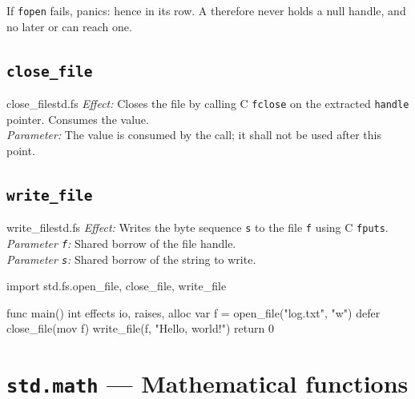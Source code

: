 \begin{note}
  If \texttt{fopen} fails,  panics: hence  in its row.  A
   therefore never holds a null handle, and no later  or
   can reach one.
\end{note}

\subsection{\texttt{close\_file}}
\label{sec:stdlib.fs.close}

\begin{functionspec}{close\_file}{std.fs}
\noindent\textit{Effect:} Closes the file by calling C \texttt{fclose} on
the extracted \texttt{handle} pointer.  Consumes the  value.\\
\noindent\textit{Parameter:} The  value is consumed by the call;
it shall not be used after this point.
\end{functionspec}

\subsection{\texttt{write\_file}}
\label{sec:stdlib.fs.write}

\begin{functionspec}{write\_file}{std.fs}
\noindent\textit{Effect:} Writes the byte sequence \texttt{s} to the file
\texttt{f} using C \texttt{fputs}.\\
\noindent\textit{Parameter \texttt{f}:} Shared borrow of the file handle.\\
\noindent\textit{Parameter \texttt{s}:} Shared borrow of the string to write.
\end{functionspec}

\begin{example}
\begin{laincode}
import std.fs.{open_file, close_file, write_file}

func main() int effects io, raises, alloc {
    var f = open_file("log.txt", "w")
    defer close_file(mov f)
    write_file(f, "Hello, world!\n")
    return 0
}
\end{laincode}
\end{example}

\section{\texttt{std.math} — Mathematical functions}
\label{sec:stdlib.math}

